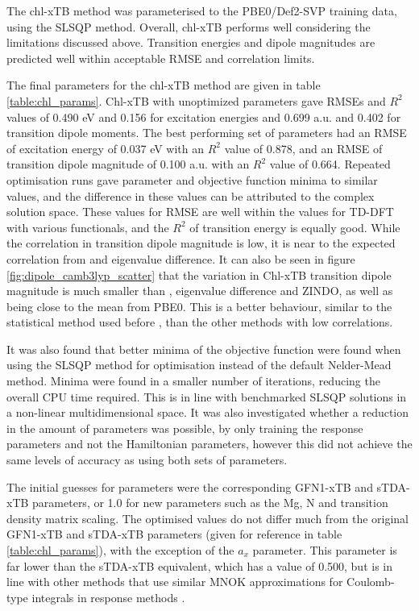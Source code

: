 The chl-xTB method was parameterised to the PBE0/Def2-SVP training data, using the
SLSQP method. Overall, chl-xTB performs well considering the limitations discussed 
above. Transition energies and dipole magnitudes are predicted well within acceptable
RMSE and correlation limits.

The final parameters for the chl-xTB method are given in table \ref{table:chl_params}.
Chl-xTB with unoptimized parameters gave RMSEs and $R^2$ values of 0.490 eV and 0.156 
for excitation energies and 0.699 a.u. and 0.402 for transition dipole moments. The
best performing set of parameters had an RMSE of excitation energy of 0.037 eV with
 an $R^2$ value of 0.878, and an RMSE of transition dipole magnitude of 0.100 a.u. 
with an $R^2$ value of 0.664. Repeated optimisation runs gave parameter and objective
function minima to similar values, and the difference in these values can be attributed
to the complex solution space. These values for RMSE are well within the values
for TD-DFT with various functionals, and the $R^2$ of transition energy is equally
good. While the correlation in transition dipole magnitude is low, it is near to
the expected correlation from \dscf and eigenvalue difference. It can also be seen
in figure \ref{fig:dipole_camb3lyp_scatter} that the variation in Chl-xTB transition
dipole magnitude is much smaller than \dscf, eigenvalue difference and ZINDO, as
well as being close to the mean from PBE0. This is a better behaviour, similar to
the statistical method used before \cite{Stross2016}, than the other methods with 
low correlations.

It was also found that better minima of the objective function were found when using
the SLSQP method for optimisation instead of the default Nelder-Mead method. Minima
were found in a smaller number of iterations, reducing the overall CPU time required.
This is in line with benchmarked SLSQP solutions in a non-linear multidimensional space.
It was also investigated whether a reduction in the amount of parameters was possible,
by only training the response parameters and not the Hamiltonian parameters, however 
this did not achieve the same levels of accuracy as using both sets of parameters.

The initial guesses for parameters were the corresponding GFN1-xTB and sTDA-xTB
parameters, or 1.0 for new parameters such as the Mg, N and transition density matrix
scaling. The optimised values do not differ much from the original GFN1-xTB and 
sTDA-xTB parameters (given for reference in table \ref{table:chl_params}), with
the exception of the $a_x$ parameter. This parameter is far lower than the sTDA-xTB
equivalent, which has a value of 0.500, but is in line with other methods that use 
similar MNOK approximations for Coulomb-type integrals in response methods \cite{Cho2021}.

